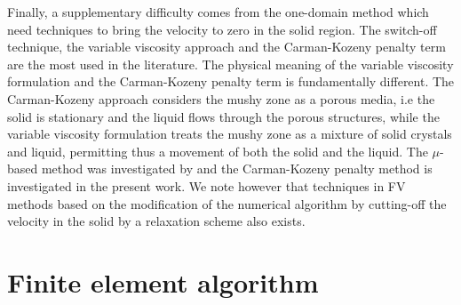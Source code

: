 Finally, a supplementary difficulty comes from the one-domain method which need techniques to bring the velocity to zero in the solid region.
The switch-off technique, the variable viscosity approach and the Carman-Kozeny penalty term are the most used in the literature.
The physical meaning of the variable viscosity formulation and the Carman-Kozeny penalty term is fundamentally different.
The Carman-Kozeny approach considers the mushy zone as a porous media, i.e the solid is stationary and the liquid flows through the porous structures, 
while the variable viscosity formulation treats the mushy zone as a mixture of solid crystals and liquid, permitting thus a movement of both the solid and the liquid.
The $\mu$-based method was investigated by \cite{dan-2014-JCP} and the Carman-Kozeny penalty method is investigated in the present work.
We note however that techniques in FV methods based on the modification of the numerical algorithm by cutting-off the velocity in the solid by a relaxation scheme also exists.

\newpage
\section{Finite element algorithm} \label{sec-FE-algo}


